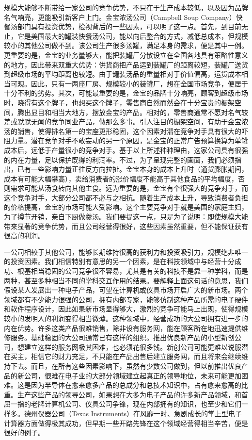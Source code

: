 \documentclass[UTF8,a4paper,zihao=-4,fontset = windows]{ctexart} %
\begin{document}
规模大能够不断带给一家公司的竞争优势，不只在于生产成本较低，以及因为品牌名气响亮，更能吸引新客户上门。金宝浓汤公司（Campbell Soup Company）快餐汤部门具有投资优势，检视背后的一些因素，可以明了这一点。首先，到目前无止，它是美国最大的罐装快餐汤公司，能以向后整合的方式，减低总成本，但规模较小的其他公司做不到。该公司生产很多汤罐，满足本身的需求，便是其中一例。更重要的是，金宝的业务量够大，能把装罐厂分散设立在全国各地具有策略性意义的地方，因此带来双重大优势：供货商把产品运到装罐厂的距离较短，装罐厂送货到超级市场的平均距离也较短。由于罐装汤品的重量相对于价值偏高，运货成本相当可观。因此，只有一两座厂房、规模较小的装罐厂，想在全国市场竞争，便居于十分不利的劣势。其次，可能最重要的是，金宝的品牌十分响亮，顾客到超级市场时，晓得有这个牌子，也想买这个牌子，零售商自然而然会在十分宝贵的橱架空间，腾出显目和相当大地方，摆放金宝的产品。相对的，零售商通常不愿对名气较差或默默无闻的竞争同业产品，做那么多事。引人注目的橱架空间，有助于金宝浓汤的销售，使得排名第一的宝座更形稳固，这个因素对潜在竞争对手具有很大的吓阻力量。潜在竞争对手不敢妄动的另一个原因，是金宝的正常广告预算换算为单罐成本后，远低于产量很小的竞争对手。基于以上所述种种理由，这家公司具有很强的内在力量，足以保护既得的利润率。不过，为了呈现完整的画面，我们必须指出，已有一些影响力量正往反方向拉扯。金宝本身的成本上升时（通货膨胀期间，成本有可能大幅攀高），卖给消费者的涨价幅度不能高于其他食品的平均幅度，否则需求可能从汤食转向其他主食。远为重要的是，金宝有个很强大的竞争对手，而这个竞争对手，大部分公司都不必与之相抗。随着生产成本上升，导致消费者负担的价格提高，金宝的市场可能大受影响。这个主要竞争对手就是美国的家庭主妇，为了撙节开销，亲自下厨做羹汤。我们要提这一点，只是为了说明：即使规模大能带来显著的竞争优势，而且公司经营得很好，这些因素虽然重要，但不能保证获有很高的利润。

一公司相较于其他公司，能够长期维持很高的获利力和投资吸引力，规模绝非唯一的投资因素。我们相信特别有意思的另一个因素，是在科技领域中与经营十分成功、根基相当稳固的公司竞争很不容易，尤其是有关的科技不是靠一种学科，而是两种，甚至多种相当不同的学科交互作用的结果。要解释上面这句话的意思，我们假设某人发展出一种电子产品，可望在计算机或仪具市场开启广大的新市场。两个领域都有不少能力很强的公司，拥有内部专家，能够仿制这种产品所需的电子硬件和软件程序设计，因此如果新市场显得够大，激烈的竞争可能马上出现，使得规模较小的发明人的利润变得相当微薄。这种领域中，经营成功的大公司拥有进一步的内在优势。许多这类产品很难销售，除非设有服务网，能在顾客所在地迅速提供维修服务。基础稳固的大公司通常已有这样的组织。推出优良新产品的小型新创公司，想建立这样的服务网极其困难，也必须花很多钱。新创公司可能更难以说服潜在买主，相信它的财力充足，不只能在产品出售后建立服务网，而且将来会继续维持下去。而且，在所有这些因素影响下，虽然有少数公司做到，但以前推出优良产品的新公司，很难在电子业的大部分领域建立起真正的领导地位，未来可能更加困难。这是因为半导体在愈来愈多产品的总成分和总技术知识中，占有愈来愈高的比重。生产这些产品的领导公司，如果想在大多为电子产品的许多新产品领域，和首屈一指的老牌计算机公司、仪具公司争锋，现在内部拥有的知识，也至少和它们一样多。德州仪器公司（Texas Instruments）在风靡一时、急剧成长的掌上型电子计算器方面做得极其成功，但早期一些开路先锋在这个领域经营得相当辛苦，便是很好的例子。
\end{document}
